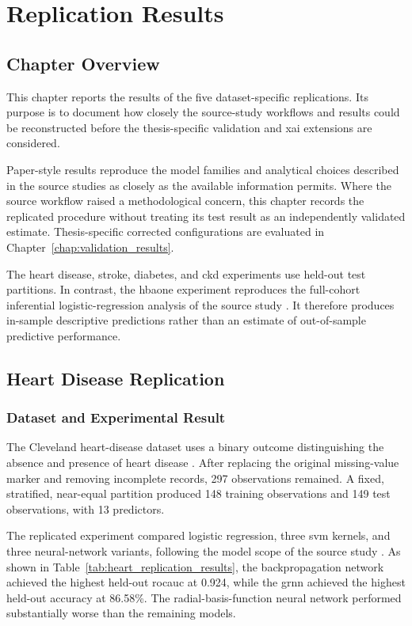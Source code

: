 \chapter{Replication Results}
\label{chap:replication_results}
\section{Chapter Overview}

This chapter reports the results of the five dataset-specific replications. Its purpose is to document how closely the source-study workflows and results could be reconstructed before the thesis-specific validation and \gls{xai} extensions are considered.

Paper-style results reproduce the model families and analytical choices described in the source studies as closely as the available information permits. Where the source workflow raised a methodological concern, this chapter records the replicated procedure without treating its test result as an independently validated estimate. Thesis-specific corrected configurations are evaluated in Chapter~\ref{chap:validation_results}.

The heart disease, stroke, diabetes, and \gls{ckd} experiments use held-out test partitions. In contrast, the \gls{hbaone} experiment reproduces the full-cohort inferential logistic-regression analysis of the source study \citep{strack_impact_2014}. It therefore produces in-sample descriptive predictions rather than an estimate of out-of-sample predictive performance.

\section{Heart Disease Replication}

\subsection{Dataset and Experimental Result}

The Cleveland heart-disease dataset uses a binary outcome distinguishing the absence and presence of heart disease \citep{detrano_international_1989, khanna_comparative_2015}. After replacing the original missing-value marker and removing incomplete records, 297 observations remained. A fixed, stratified, near-equal partition produced 148 training observations and 149 test observations, with 13 predictors.

The replicated experiment compared logistic regression, three \gls{svm} kernels, and three neural-network variants, following the model scope of the source study \citep{khanna_comparative_2015}. As shown in Table~\ref{tab:heart_replication_results}, the backpropagation network achieved the highest held-out \gls{rocauc} at 0.924, while the \gls{grnn} achieved the highest held-out accuracy at 86.58\%. The radial-basis-function neural network performed substantially worse than the remaining models.

